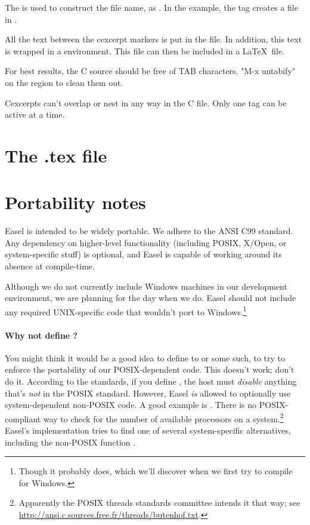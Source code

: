 The  is used to construct the file name, as
.  In the example, the tag  creates
a file  in .

All the text between the cexcerpt markers is put in the file.  In
addition, this text is wrapped in a  environment.  This
file can then be included in a \LaTeX\ file.

For best results, the C source should be free of TAB characters.
"M-x untabify" on the region to clean them out.

Cexcerpts can't overlap or nest in any way in the C file. Only one tag
can be active at a time.

\section{The .tex file}




\section{Portability notes}

Easel is intended to be widely portable. We adhere to the ANSI C99
standard. Any dependency on higher-level functionality (including
POSIX, X/Open, or system-specific stuff) is optional, and Easel is
capable of working around its absence at compile-time.

Although we do not currently include Windows machines in our
development environment, we are planning for the day when we do. Easel
should not include any required UNIX-specific code that wouldn't port
to Windows.\footnote{Though it probably does, which we'll discover
  when we first try to compile for Windows.}


\paragraph{Why not define ?} You might think
it would be a good idea to define  to
 or some such, to try to enforce the portability of our
POSIX-dependent code. This doesn't work; don't do it.  According to
the standards, if you define , the host must
\emph{disable} anything that's \emph{not} in the POSIX
standard. However, Easel \emph{is} allowed to optionally use
system-dependent non-POSIX code. A good example is
. There is no
POSIX-compliant way to check for the number of available processors on
a system.\footnote{Apparently the POSIX threads standards committee
  intends it that way; see
  \url{http://ansi.c.sources.free.fr/threads/butenhof.txt}.} 
Easel's implementation tries to find one of several system-specific
alternatives, including the non-POSIX function . 




